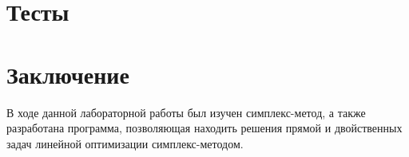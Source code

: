 \documentclass[14pt, titlepage,fleqn]{extarticle}
\begin{document}
    \section*{Тесты}
    \begin{figure}[H]
    \end{figure}



	\newpage
	\section*{Заключение}
	В ходе данной лабораторной работы был изучен симплекс-метод, а также разработана программа, позволяющая находить решения прямой и двойственных задач линейной оптимизации симплекс-методом.
\end{document}
